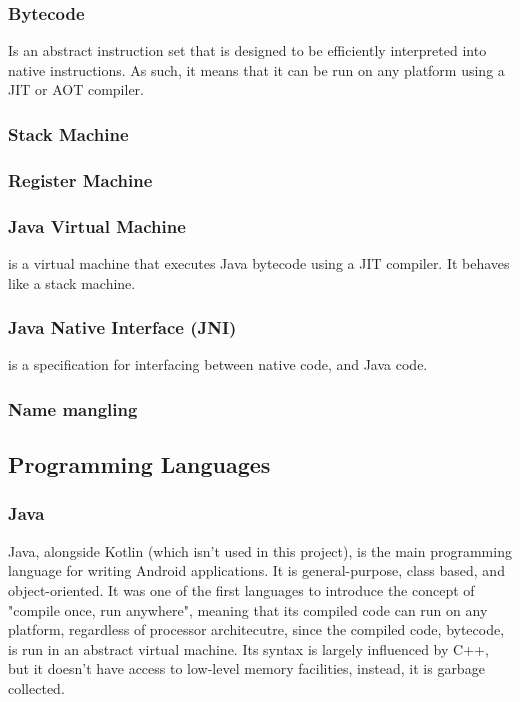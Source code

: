         \subsubsection{Bytecode} Is an abstract instruction set that is designed to be efficiently interpreted into native instructions. As such, it means that it can be run on any platform using a JIT or AOT compiler.
        \subsubsection{Stack Machine}
        \subsubsection{Register Machine}
        \subsubsection{Java Virtual Machine} is a virtual machine that executes Java bytecode using a JIT compiler. It behaves like a stack machine.
        \subsubsection{Java Native Interface (JNI)} is a specification for interfacing between native code, and Java code.
        \subsubsection{Name mangling}

    \subsection{Programming Languages}
        \subsubsection{Java}
        Java, alongside Kotlin (which isn't used in this project), is the main programming language for writing Android applications. It is general-purpose, class based, and object-oriented. It was one of the first languages to introduce the concept of "compile once, run anywhere", meaning that its compiled code can run on any platform, regardless of processor architecutre, since the compiled code, bytecode, is run in an abstract virtual machine. Its syntax is largely influenced by C++, but it doesn't have access to low-level memory facilities, instead, it is garbage collected.
